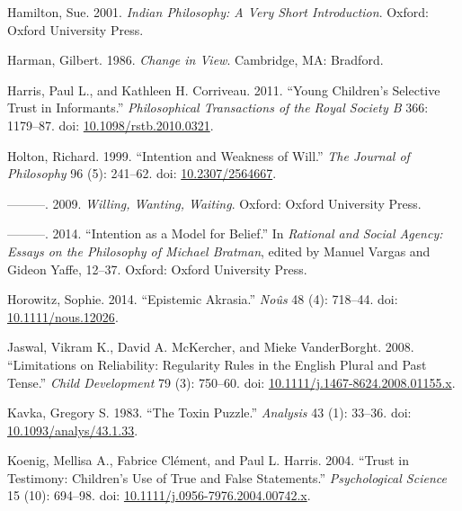 \documentclass[
  10pt,
  letterpaper,
  DIV=11,
  numbers=noendperiod,
  twoside]{scrartcl}
\newlength{\cslhangindent}
\newenvironment{CSLReferences}[2] %
 {\begin{list}{}{%
  \setlength{\itemindent}{0pt}
  \setlength{\leftmargin}{0pt}
  \setlength{\parsep}{0pt}
  \ifodd #1
   \setlength{\leftmargin}{\cslhangindent}
   \setlength{\itemindent}{-1\cslhangindent}
  \fi
  \setlength{\itemsep}{#2\baselineskip}}}
 {\end{list}}
\begin{document}
\begin{CSLReferences}{1}{0}
Hamilton, Sue. 2001. \emph{Indian Philosophy: A Very Short
Introduction}. Oxford: {O}xford {U}niversity {P}ress.

Harman, Gilbert. 1986. \emph{Change in View}. Cambridge, MA: Bradford.

Harris, Paul L., and Kathleen H. Corriveau. 2011. {``Young Children's
Selective Trust in Informants.''} \emph{Philosophical Transactions of
the Royal Society B} 366: 1179--87. doi:
\href{https://doi.org/10.1098/rstb.2010.0321}{10.1098/rstb.2010.0321}.

Holton, Richard. 1999. {``Intention and Weakness of Will.''} \emph{The
Journal of Philosophy} 96 (5): 241--62. doi:
\href{https://doi.org/10.2307/2564667}{10.2307/2564667}.

---------. 2009. \emph{Willing, Wanting, Waiting}. Oxford: Oxford
University Press.

---------. 2014. {``Intention as a Model for Belief.''} In
\emph{Rational and Social Agency: Essays on the Philosophy of Michael
Bratman}, edited by Manuel Vargas and Gideon Yaffe, 12--37. Oxford:
Oxford University Press.

Horowitz, Sophie. 2014. {``Epistemic Akrasia.''} \emph{No{û}s} 48 (4):
718--44. doi:
\href{https://doi.org/10.1111/nous.12026}{10.1111/nous.12026}.

Jaswal, Vikram K., David A. McKercher, and Mieke VanderBorght. 2008.
{``Limitations on Reliability: Regularity Rules in the English Plural
and Past Tense.''} \emph{Child Development} 79 (3): 750--60. doi:
\href{https://doi.org/10.1111/j.1467-8624.2008.01155.x}{10.1111/j.1467-8624.2008.01155.x}.

Kavka, Gregory S. 1983. {``The Toxin Puzzle.''} \emph{Analysis} 43 (1):
33--36. doi:
\href{https://doi.org/10.1093/analys/43.1.33}{10.1093/analys/43.1.33}.

Koenig, Mellisa A., Fabrice Clément, and Paul L. Harris. 2004. {``Trust
in Testimony: Children's Use of True and False Statements.''}
\emph{Psychological Science} 15 (10): 694--98. doi:
\href{https://doi.org/10.1111/j.0956-7976.2004.00742.x}{10.1111/j.0956-7976.2004.00742.x}.


\end{CSLReferences}
\end{document}
